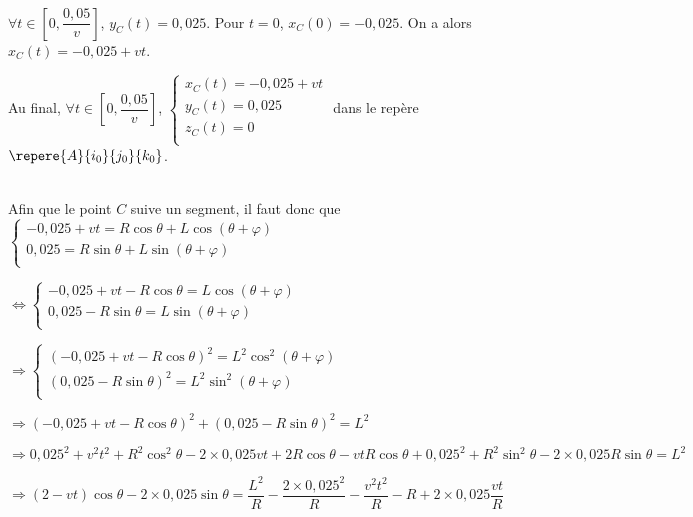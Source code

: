 \ifprof ~\\
$\forall t \in \left[0,\dfrac{0,05}{v}\right]$, $y_C(t)=0,025$. 
Pour $t=0$, $x_C(0)=-0,025$. On a alors $x_C(t)=-0,025+vt$.  

Au final, $\forall t \in \left[0,\dfrac{0,05}{v}\right]$, $\left\{
\begin{array}{l}
x_C(t)= -0,025+vt\\
y_C(t)= 0,025\\
z_C(t)= 0\\
\end{array}
\right.
$ dans le repère $\repere{A}{i_0}{j_0}{k_0}$.


\else
\fi

\ifprof ~\\
Afin que le point $C$ suive un segment, il faut donc que 
$\left\{
\begin{array}{l}
-0,025+vt= R\cos\theta  +L\cos\left(\theta+\varphi\right)  \\
0,025 = R \sin\theta + L\sin\left(\theta+\varphi\right)\\
\end{array}
\right.
$

$\Leftrightarrow 
\left\{
\begin{array}{l}
-0,025+vt- R\cos\theta  =L\cos\left(\theta+\varphi\right)  \\
0,025 - R \sin\theta  = L\sin\left(\theta+\varphi\right)\\
\end{array}
\right.
$

$\Rightarrow 
\left\{
\begin{array}{l}
\left(-0,025+vt- R\cos\theta\right)^2  =L^2\cos^2\left(\theta+\varphi\right)  \\
\left(0,025 - R \sin\theta  \right)^2= L^2\sin^2\left(\theta+\varphi\right)\\
\end{array}
\right.
$

$\Rightarrow 
\left(-0,025+vt- R\cos\theta\right)^2  + \left(0,025 - R \sin\theta  \right)^2 = L^2
$

$\Rightarrow 
0,025^2+v^2t^2+R^2\cos^2\theta -2\times 0,025 vt+2R\cos\theta-vtR\cos\theta
  + 0,025^2 + R^2 \sin^2\theta -2\times 0,025 R \sin\theta  =      L^2
$

$\Rightarrow 
\left(2-vt\right)\cos\theta  -2\times 0,025  \sin\theta  =      \dfrac{L^2}{R} - \dfrac{2\times0,025^2}{R}-\dfrac{v^2t^2}{R}-R +2\times 0,025 \dfrac{vt}{R}
$


